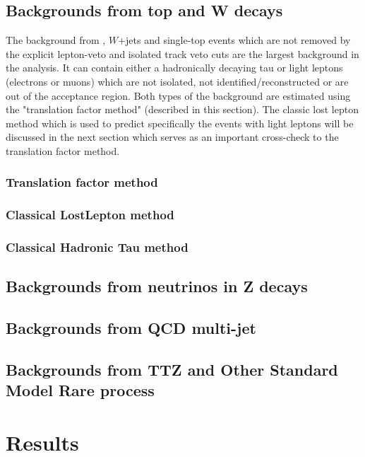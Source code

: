 \clearpage
\subsection{Backgrounds from top and W decays}
The background from \ttbar, $W$+jets and single-top events which are not removed by the explicit lepton-veto and isolated track veto cuts are the largest background in the analysis. It can contain either a hadronically decaying tau or light leptons (electrons or muons) which are not isolated, not identified/reconstructed or are out of the acceptance region. Both types of the background are estimated using the "translation factor method" (described in this section). The classic lost lepton method which is used to predict specifically the events with light leptons will be discussed in the next section which serves as an important cross-check to the translation factor method.

\clearpage
\subsubsection{Translation factor method}
\label{sec:c4bgtf}


\clearpage
\subsubsection{Classical LostLepton method}
\label{sec:c4bgll}


\clearpage
\subsubsection{Classical Hadronic Tau method}
\label{sec:c4bghadtau}


\clearpage
\subsection{Backgrounds from neutrinos in Z decays}
\label{sec:c4bgzinv}


\clearpage
\subsection{Backgrounds from QCD multi-jet}
\label{sec:c4bgqcd}


\clearpage
\subsection{Backgrounds from TTZ and Other Standard Model Rare process}
\label{sec:c4bgttzrare}


\clearpage
\section{Results}
\label{sec:c4results}

